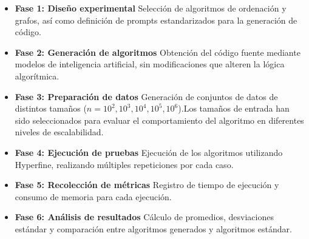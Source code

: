 \begin{itemize}
    \item \textbf{Fase 1: Diseño experimental}  
    Selección de algoritmos de ordenación y grafos, así como definición de prompts estandarizados para la generación de código.
    
    \item \textbf{Fase 2: Generación de algoritmos}  
    Obtención del código fuente mediante modelos de inteligencia artificial, sin modificaciones que alteren la lógica algorítmica.
    
    \item \textbf{Fase 3: Preparación de datos}  
    Generación de conjuntos de datos de distintos tamaños ($n = 10^2, 10^3, 10^4, 10^5, 10^6$).Los tamaños de entrada han sido seleccionados para evaluar el comportamiento del algoritmo en diferentes niveles de escalabilidad.
    
    \item \textbf{Fase 4: Ejecución de pruebas}  
    Ejecución de los algoritmos utilizando Hyperfine, realizando múltiples repeticiones por cada caso.
    
    \item \textbf{Fase 5: Recolección de métricas}  
    Registro de tiempo de ejecución y consumo de memoria para cada ejecución.
    
    \item \textbf{Fase 6: Análisis de resultados}  
    Cálculo de promedios, desviaciones estándar y comparación entre algoritmos generados y algoritmos estándar.
\end{itemize}


